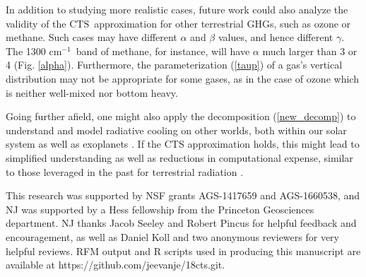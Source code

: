 \documentclass{ametsoc}
\newcommand{\eqnref}[1]{(\ref{#1})}
\newcommand{\cminverse}{\ensuremath{\mathrm{cm^{-1}}}}
\newcommand{\CTS}{\ensuremath{\mathrm{CTS}}}
\begin{document}
In addition to studying more realistic cases, future work could also analyze the validity of the \CTS\ approximation for other terrestrial GHGs, such as ozone or methane. Such cases may have different $\alpha$ and $\beta$ values, and hence different $\gamma$.  The 1300 \cminverse\ band of methane, for instance, will have  $\alpha$  much larger than 3 or 4 (Fig. \ref{alpha}). Furthermore, the parameterization \eqnref{taup} of a gas's vertical distribution may not be appropriate for some gases, as in the case of ozone which is neither well-mixed nor bottom heavy.  

Going further afield, one might also apply the decomposition \eqnref{new_decomp} to understand and model radiative cooling on other worlds, both within our solar system as well as exoplanets \citep[e.g.][]{amundsen2014}. If the CTS approximation holds, this might lead to simplified understanding as well as reductions in computational expense, similar to those leveraged in the past for terrestrial radiation  \citep[e.g.][]{schwarzkopf1991,fels1975}.



%
\acknowledgments
This research was supported by NSF grants AGS-1417659 and AGS-1660538, and NJ was supported by a  Hess fellowship from the Princeton Geosciences department.  NJ  thanks Jacob Seeley and Robert Pincus for helpful feedback and encouragement, as well as Daniel Koll and two anonymous reviewers for very helpful reviews. RFM output and R scripts used in producing this manuscript are available at  https://github.com/jeevanje/18cts.git.


%
\end{document}
